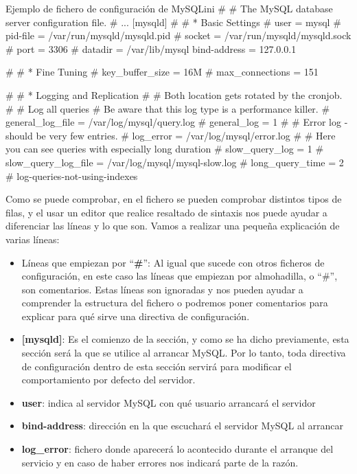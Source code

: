 \begin{mycode}{Ejemplo de fichero de configuración de MySQL}{ini}{}
#
# The MySQL database server configuration file.
# ...
[mysqld]
#
# * Basic Settings
#
user            = mysql
# pid-file      = /var/run/mysqld/mysqld.pid
# socket        = /var/run/mysqld/mysqld.sock
# port          = 3306
# datadir       = /var/lib/mysql
bind-address      = 127.0.0.1

#
# * Fine Tuning
#
key_buffer_size         = 16M
# max_connections        = 151

#
# * Logging and Replication
#
# Both location gets rotated by the cronjob.
#
# Log all queries
# Be aware that this log type is a performance killer.
# general_log_file        = /var/log/mysql/query.log
# general_log             = 1
#
# Error log - should be very few entries.
#
log_error = /var/log/mysql/error.log
#
# Here you can see queries with especially long duration
# slow_query_log                = 1
# slow_query_log_file   = /var/log/mysql/mysql-slow.log
# long_query_time = 2
# log-queries-not-using-indexes
\end{mycode}

Como se puede comprobar, en el fichero se pueden comprobar distintos tipos de filas, y el usar un editor que realice resaltado de sintaxis nos puede ayudar a diferenciar las líneas y lo que son. Vamos a realizar una pequeña explicación de varias líneas:

\begin{itemize}
    \item Líneas que empiezan por “\textbf{\#}”:  Al igual que sucede con otros ficheros de configuración, en este caso las líneas que empiezan por almohadilla, o “\#”, son comentarios. Estas líneas son ignoradas y nos pueden ayudar a comprender la estructura del fichero o podremos poner comentarios para explicar para qué sirve una directiva de configuración.
    \item \textbf{[mysqld]}: Es el comienzo de la sección, y como se ha dicho previamente, esta sección será la que se utilice al arrancar MySQL. Por lo tanto, toda directiva de configuración dentro de esta sección servirá para modificar el comportamiento por defecto del servidor.
    \item \textbf{user}: indica al servidor MySQL con qué usuario arrancará el servidor
    \item \textbf{bind-address}: dirección en la que escuchará el servidor MySQL al arrancar
    \item \textbf{log\_error}: fichero donde aparecerá lo acontecido durante el arranque del servicio y en caso de haber errores nos indicará parte de la razón.
\end{itemize}


